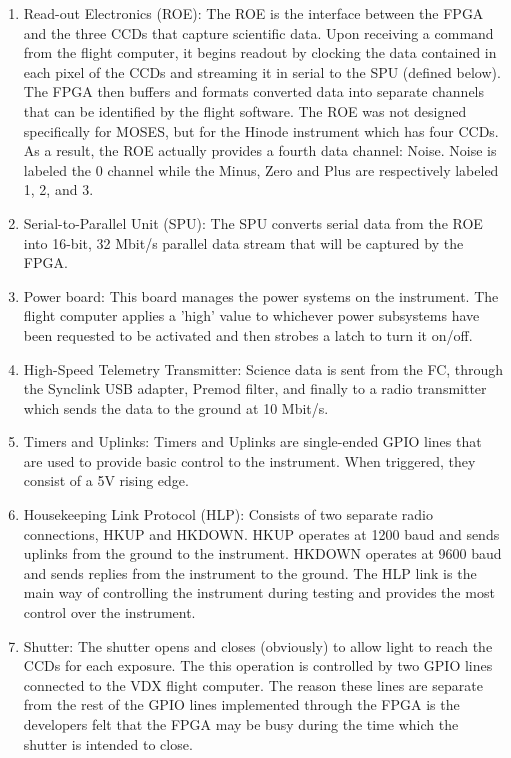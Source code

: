 \begin{enumerate}
\begin{enumerate}
			\item Read-out Electronics (ROE):  The ROE is the interface between the FPGA and the three CCDs that capture scientific data. Upon receiving a command from the flight computer, it begins readout by clocking the data contained in each pixel of the CCDs and streaming it in serial to the SPU (defined below). The FPGA then buffers and formats converted data into separate channels that can be identified by the flight software. The ROE was not designed specifically for MOSES, but for the Hinode instrument which has four CCDs. As a result, the ROE actually provides a fourth data channel: Noise. Noise is labeled the 0 channel while the Minus, Zero and Plus are respectively labeled 1, 2, and 3.
			\item Serial-to-Parallel Unit (SPU): The SPU converts serial data from the ROE into 16-bit, 32 Mbit/s parallel data stream that will be captured by the FPGA. 
			\item Power board: This board manages the power systems on the instrument. The flight computer applies a 'high' value to whichever power subsystems have been requested to be activated and then strobes a latch to turn it on/off.
			\item High-Speed Telemetry Transmitter: Science data is sent from the FC, through the Synclink USB adapter, Premod filter, and finally to a radio transmitter which sends the data to the ground at 10 Mbit/s.
			\item Timers and Uplinks: Timers and Uplinks are single-ended GPIO lines that are used to provide basic control to the instrument. When triggered, they consist of a 5V rising edge.
			\item Housekeeping Link Protocol (HLP): Consists of two separate radio connections, HKUP and HKDOWN. HKUP operates at 1200 baud and sends uplinks from the ground to the instrument. HKDOWN operates at 9600 baud and sends replies from the instrument to the ground. The HLP link is the main way of controlling the instrument during testing and provides the most control over the instrument.
			\item Shutter: The shutter opens and closes (obviously) to allow light to reach the CCDs for each exposure. The this operation is controlled by two GPIO lines connected to the VDX flight computer. The reason these lines are separate from the rest of the GPIO lines implemented through the FPGA is the developers felt that the FPGA may be busy during the time which the shutter is intended to close.			
		\end{enumerate}

\end{enumerate}
